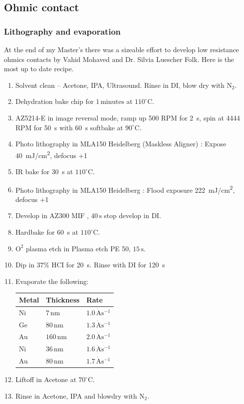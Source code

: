 \subsection{Ohmic contact}

\subsubsection{Lithography and evaporation}


At the end of my Master's there was a sizeable effort to develop low resistance ohmics contacts by Vahid Mohaved and Dr. Silvia Luescher Folk. Here is the most up to date recipe. 


\begin{enumerate}
\item Solvent clean – Acetone, IPA, Ultrasound. Rinse in DI, blow dry with $\mathrm{N_2}$.
\item Dehydration bake chip for $1 \,\mathrm{minutes}$ at $110^\circ$C.
\item AZ5214-E in image reversal mode, ramp up 500 RPM for \qty{2}{s}, spin at 4444 RPM for \qty{50}{s} with \qty{60}{s} softbake at $90^\circ$C.
\item Photo lithography in MLA150 Heidelberg (Maskless Aligner) : Expose \qty{40}{mJ/cm^2}, defocus +1 
\item IR bake for \qty{30}{s} at $110^\circ$C.
\item Photo lithography in MLA150 Heidelberg : Flood exposure \qty{222}{mJ/cm^2}, defocus +1 
\item Develop in AZ300 MIF , $40\,\mathrm{s}$ stop develop in DI.
\item Hardbake for \qty{60}{s} at $110^\circ$C.
\item $\mathrm{O^2}$ plasma etch in Plasma etch PE 50, $15\,\mathrm{s}$.
\item Dip in $37\%$ HCI for \qty{20}{s}. Rinse with DI for \qty{120}{s}

\item Evaporate the following:

\begin{table}[H]  
\centering
 \begin{tabular}{|p{2.0cm}|p{2.0cm}|p{2.0cm}|}
 \hline
 Metal & Thickness & Rate\\
 \hline
 Ni & $7\,\mathrm{nm}$ & $1.0\,\mathrm{\dot{A}s^{-1}}$\\
 Ge & $80\,\mathrm{nm}$ & $1.3\,\mathrm{\dot{A}s^{-1}}$\\
 Au & $160\,\mathrm{nm}$ & $2.0\,\mathrm{\dot{A}s^{-1}}$\\
 Ni & $36\,\mathrm{nm}$ & $1.6\,\mathrm{\dot{A}s^{-1}}$\\
 Au & $80\,\mathrm{nm}$ & $1.7\,\mathrm{\dot{A}s^{-1}}$\\
 \hline
 \end{tabular}
\label{tab:ohmic_evaporation}
\end{table}
\item Liftoff in Acetone at $70^\circ$C.
\item Rinse in Acetone, IPA and blowdry with $\mathrm{N_2}$.
\end{enumerate}



